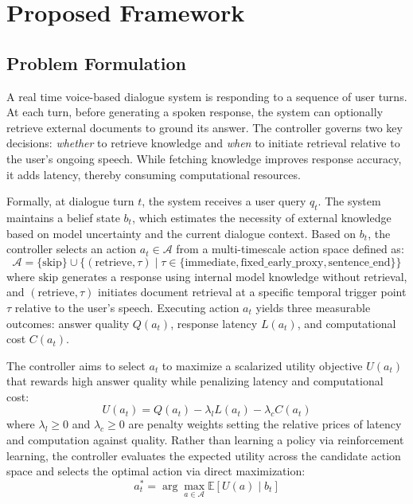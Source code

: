 \section{Proposed Framework}

\subsection{Problem Formulation}
\label{subsec:problem_formulation}
A real time voice-based dialogue system is responding to a sequence of user turns. At each turn, before generating a spoken response, the system can optionally retrieve external documents to ground its answer.
The controller governs two key decisions: \textit{whether} to retrieve knowledge and \textit{when} to initiate retrieval relative to the user's ongoing speech. While fetching knowledge improves response accuracy, it adds latency, thereby consuming computational resources.

Formally, at dialogue turn $t$, the system receives a user query $q_t$. The system maintains a belief state $b_t$, which estimates the necessity of external knowledge based on model uncertainty and the current dialogue context. Based on $b_t$, the controller selects an action $a_t \in \mathcal{A}$ from a multi-timescale action space defined as:
\begin{equation}
\mathcal{A} = \{\text{skip}\} \cup \{(\text{retrieve}, \tau) \mid \tau \in \{\text{immediate}, \text{fixed\_early\_proxy}, \text{sentence\_end}\}\}
\end{equation}
where $\text{skip}$ generates a response using internal model knowledge without retrieval, and $(\text{retrieve}, \tau)$ initiates document retrieval at a specific temporal trigger point $\tau$ relative to the user's speech.
Executing action $a_t$ yields three measurable outcomes: answer quality $Q(a_t)$, response latency $L(a_t)$, and computational cost $C(a_t)$.

The controller aims to select $a_t$ to maximize a scalarized utility objective $U(a_t)$ that rewards high answer quality while penalizing latency and computational cost:
\begin{equation}
U(a_t) = Q(a_t) - \lambda_l L(a_t) - \lambda_c C(a_t)
\end{equation}  
where $\lambda_l \ge 0$ and $\lambda_c \ge 0$ are penalty weights setting the relative prices of latency and computation against quality. Rather than learning a policy via reinforcement learning, the controller evaluates the expected utility across the candidate action space and selects the optimal action via direct maximization:
\begin{equation}
a_t^* = \arg\max_{a \in \mathcal{A}} \mathbb{E}[U(a) \mid b_t]
\end{equation}

